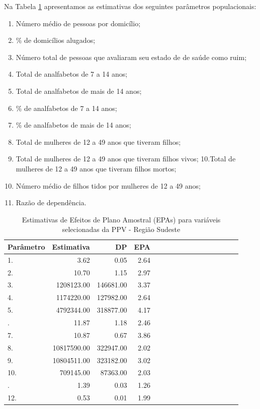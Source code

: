 \documentclass[]{book}
\providecommand{\tightlist}{%
  \setlength{\itemsep}{0pt}\setlength{\parskip}{0pt}}
\theoremstyle{definition}
\theoremstyle{definition}
\theoremstyle{definition}
\theoremstyle{remark}
\begin{document}
Na Tabela \ref{tab:epas} apresentamos as estimativas dos seguintes
parâmetros populacionais:

\begin{enumerate}
\def\labelenumi{\arabic{enumi}.}
\tightlist
\item
  Número médio de pessoas por domicílio;
\item
  \% de domicílios alugados;
\item
  Número total de pessoas que avaliaram seu estado de de saúde como
  ruim;
\item
  Total de analfabetos de 7 a 14 anos;
\item
  Total de analfabetos de mais de 14 anos;
\item
  \% de analfabetos de 7 a 14 anos;
\item
  \% de analfabetos de mais de 14 anos;
\item
  Total de mulheres de 12 a 49 anos que tiveram filhos;
\item
  Total de mulheres de 12 a 49 anos que tiveram filhos vivos; 10.Total
  de mulheres de 12 a 49 anos que tiveram filhos mortos;
\item
  Número médio de filhos tidos por mulheres de 12 a 49 anos;
\item
  Razão de dependência.
\end{enumerate}

\begin{table}

\caption{\label{tab:epas}Estimativas de Efeitos de Plano Amostral (EPAs)
para variáveis selecionadas da PPV - Região Sudeste}
\centering
\begin{tabular}[t]{lrrrlrrrlrrrlrrr}
\toprule
Parâmetro & Estimativa & DP & EPA\\
\midrule
1. & 3.62 & 0.05 & 2.64\\
2. & 10.70 & 1.15 & 2.97\\
3. & 1208123.00 & 146681.00 & 3.37\\
4. & 1174220.00 & 127982.00 & 2.64\\
5. & 4792344.00 & 318877.00 & 4.17\\
\addlinespace
6. & 11.87 & 1.18 & 2.46\\
7. & 10.87 & 0.67 & 3.86\\
8. & 10817590.00 & 322947.00 & 2.02\\
9. & 10804511.00 & 323182.00 & 3.02\\
10. & 709145.00 & 87363.00 & 2.03\\
\addlinespace
11. & 1.39 & 0.03 & 1.26\\
12. & 0.53 & 0.01 & 1.99\\
\bottomrule
\end{tabular}
\end{table}
\end{document}
